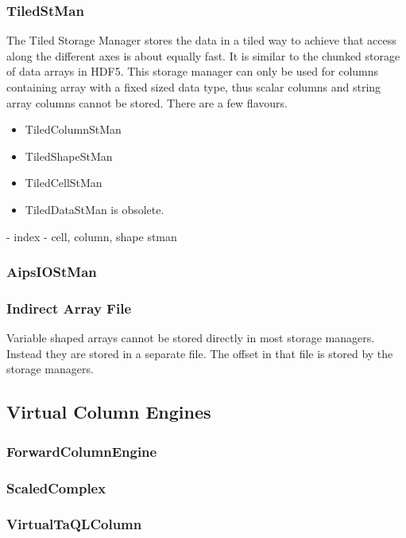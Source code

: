 \subsubsection{TiledStMan}
The Tiled Storage Manager stores the data in a tiled way
to achieve that access along the different axes is about equally fast.
It is similar to the chunked storage of data arrays 
in HDF5.
This storage manager can only be used for columns containing array
with a fixed sized data type, thus scalar columns and string array
columns cannot be stored.
There are a few flavours.
\begin{itemize}
\item TiledColumnStMan 
\item TiledShapeStMan 
\item TiledCellStMan 
\item TiledDataStMan is obsolete.
\end{itemize}

- index
- cell, column, shape stman


\subsubsection {AipsIOStMan}

\subsubsection{\label{CTDS:ARRAYFILE}Indirect Array File}
Variable shaped arrays cannot be stored directly in most storage
managers. Instead they are stored in a separate file. The offset in
that file is stored by the storage managers.




\subsection{Virtual Column Engines}

\subsubsection{ForwardColumnEngine}

\subsubsection{ScaledComplex}

\subsubsection{VirtualTaQLColumn}


